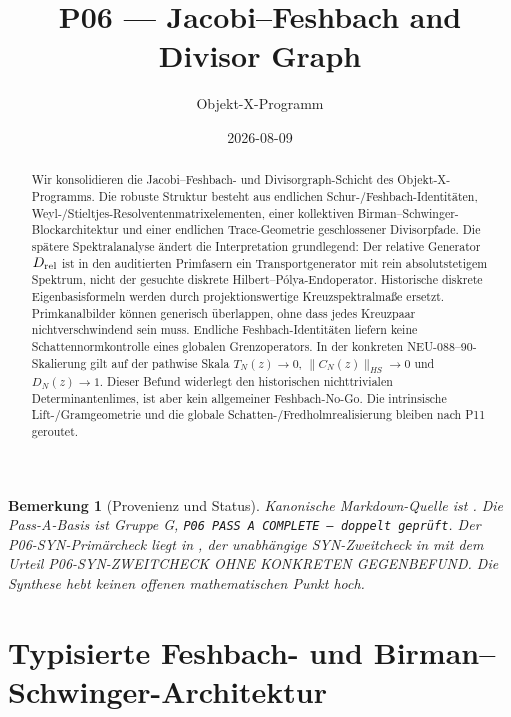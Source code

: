 \documentclass[11pt,a4paper]{amsart}
\title[P06 --- Jacobi--Feshbach]{P06 --- Jacobi--Feshbach and Divisor Graph}
\author{Objekt-X-Programm}
\date{2026-08-09}
\newtheorem{remark}[theorem]{Bemerkung}
\begin{document}
\begin{abstract}
Wir konsolidieren die Jacobi--Feshbach- und Divisorgraph-Schicht des
Objekt-X-Programms. Die robuste Struktur besteht aus endlichen
Schur-/Feshbach-Identitäten, Weyl-/Stieltjes-Resolventenmatrixelementen,
einer kollektiven Birman--Schwinger-Blockarchitektur und einer endlichen
Trace-Geometrie geschlossener Divisorpfade. Die spätere Spektralanalyse
ändert die Interpretation grundlegend: Der relative Generator
$D_{\rm rel}$ ist in den auditierten Primfasern ein Transportgenerator mit
rein absolutstetigem Spektrum, nicht der gesuchte diskrete
Hilbert--Pólya-Endoperator. Historische diskrete Eigenbasisformeln werden
durch projektionswertige Kreuzspektralmaße ersetzt. Primkanalbilder können
generisch überlappen, ohne dass jedes Kreuzpaar nichtverschwindend sein muss.
Endliche Feshbach-Identitäten liefern keine Schattennormkontrolle eines
globalen Grenzoperators. In der konkreten NEU-088--90-Skalierung gilt auf der
pathwise Skala $T_N(z)\to0$, $\|C_N(z)\|_{HS}\to0$ und $D_N(z)\to1$.
Dieser Befund widerlegt den historischen nichttrivialen Determinantenlimes,
ist aber kein allgemeiner Feshbach-No-Go. Die intrinsische Lift-/Gramgeometrie
und die globale Schatten-/Fredholmrealisierung bleiben nach P11 geroutet.
\end{abstract}

\maketitle

\begin{remark}[Provenienz und Status]\label{rem:provenance}
Kanonische Markdown-Quelle ist
.
Die Pass-A-Basis ist Gruppe G, \texttt{P06 PASS A COMPLETE --- doppelt geprüft}.
Der P06-SYN-Primärcheck liegt in
,
der unabhängige SYN-Zweitcheck in
mit dem Urteil \emph{P06-SYN-ZWEITCHECK OHNE KONKRETEN GEGENBEFUND}.
Die Synthese hebt keinen offenen mathematischen Punkt hoch.
\end{remark}

\section{Typisierte Feshbach- und Birman--Schwinger-Architektur}
\end{document}
